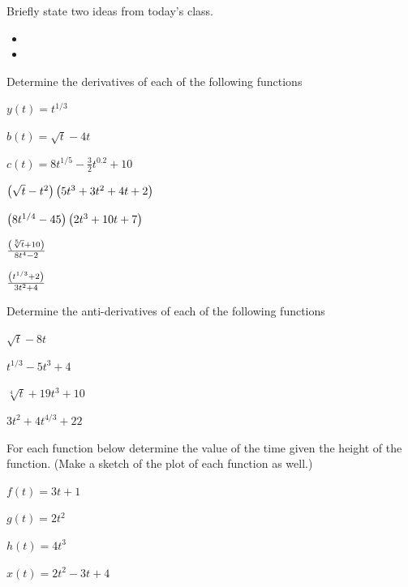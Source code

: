 \postClass

\begin{problem}
\item Briefly state two ideas from today's class.
  \begin{itemize}
  \item 
  \item 
  \end{itemize}
\item Determine the derivatives of each of the following functions
  \begin{subproblem}
    \item $y(t)=t^{1/3}$
      \vfill
    \item $b(t)=\sqrt{t} - 4t$
      \vfill
    \item $c(t) = 8 t^{1/5} - \frac{3}{2} t^{0.2} + 10$
      \vfill
    \item $\left( \sqrt{t} - t^2 \right) \left( 5 t^3 + 3 t^2 + 4t +2 \right)$
      \vfill
    \item $\left( 8 t^{1/4} - 45 \right) \left( 2 t^3 + 10 t + 7 \right)$
      \vfill
    \item $\frac{\left( \sqrt[5]{t}+10 \right)}{8t^4-2}$
      \vfill
    \item $\frac{\left( t^{1/3}+2 \right)}{3t^2+4}$
      \vfill
  \end{subproblem}
  \clearpage
\item Determine the anti-derivatives of each of the following functions
  \begin{subproblem}
    \item $\sqrt{t} - 8t$
      \vfill
    \item $t^{1/3} - 5 t^3 + 4$
      \vfill
    \item $\sqrt[4]{t} + 19 t^3 + 10$
      \vfill
    \item $3 t^2 + 4 t^{4/3} + 22$
      \vfill
  \end{subproblem}
  \clearpage
  \clearpage

\item For each function below determine the value of the time given
  the height of the function. (Make a sketch of the plot of each
  function as well.)

  \begin{subproblem}
  \item $f(t)=3t+1$
    \vfill
  \item $g(t)=2t^2$
    \vfill
  \item $h(t)=4t^3$
    \vfill
  \item $x(t)=2t^2 - 3t + 4$
    \vfill
  \end{subproblem}


  \vfill

\end{problem}



